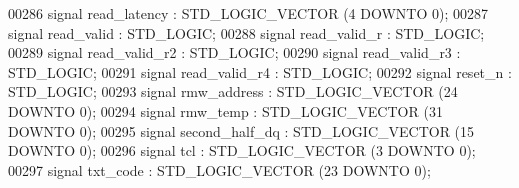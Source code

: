 \begin{DoxyCode}
00286                 \textcolor{keywordflow}{signal} \textcolor{vhdlchar}{read_latency} \textcolor{vhdlchar}{:}  \textcolor{comment}{STD\_LOGIC\_VECTOR} \textcolor{vhdlchar}{(}\textcolor{vhdllogic}{}\textcolor{vhdllogic}{4} \textcolor{keywordflow}{DOWNTO} \textcolor{vhdllogic}{}\textcolor{vhdllogic}{0}\textcolor{vhdlchar}{)};
00287                 \textcolor{keywordflow}{signal} \textcolor{vhdlchar}{read_valid} \textcolor{vhdlchar}{:}  \textcolor{comment}{STD\_LOGIC};
00288                 \textcolor{keywordflow}{signal} \textcolor{vhdlchar}{read_valid_r} \textcolor{vhdlchar}{:}  \textcolor{comment}{STD\_LOGIC};
00289                 \textcolor{keywordflow}{signal} \textcolor{vhdlchar}{read_valid_r2} \textcolor{vhdlchar}{:}  \textcolor{comment}{STD\_LOGIC};
00290                 \textcolor{keywordflow}{signal} \textcolor{vhdlchar}{read_valid_r3} \textcolor{vhdlchar}{:}  \textcolor{comment}{STD\_LOGIC};
00291                 \textcolor{keywordflow}{signal} \textcolor{vhdlchar}{read_valid_r4} \textcolor{vhdlchar}{:}  \textcolor{comment}{STD\_LOGIC};
00292                 \textcolor{keywordflow}{signal} \textcolor{vhdlchar}{reset_n} \textcolor{vhdlchar}{:}  \textcolor{comment}{STD\_LOGIC};
00293                 \textcolor{keywordflow}{signal} \textcolor{vhdlchar}{rmw_address} \textcolor{vhdlchar}{:}  \textcolor{comment}{STD\_LOGIC\_VECTOR} \textcolor{vhdlchar}{(}\textcolor{vhdllogic}{}\textcolor{vhdllogic}{24} \textcolor{keywordflow}{DOWNTO} \textcolor{vhdllogic}{}\textcolor{vhdllogic}{0}\textcolor{vhdlchar}{)};
00294                 \textcolor{keywordflow}{signal} \textcolor{vhdlchar}{rmw_temp} \textcolor{vhdlchar}{:}  \textcolor{comment}{STD\_LOGIC\_VECTOR} \textcolor{vhdlchar}{(}\textcolor{vhdllogic}{}\textcolor{vhdllogic}{31} \textcolor{keywordflow}{DOWNTO} \textcolor{vhdllogic}{}\textcolor{vhdllogic}{0}\textcolor{vhdlchar}{)};
00295                 \textcolor{keywordflow}{signal} \textcolor{vhdlchar}{second_half_dq} \textcolor{vhdlchar}{:}  \textcolor{comment}{STD\_LOGIC\_VECTOR} \textcolor{vhdlchar}{(}\textcolor{vhdllogic}{}\textcolor{vhdllogic}{15} \textcolor{keywordflow}{DOWNTO} \textcolor{vhdllogic}{}\textcolor{vhdllogic}{0}\textcolor{vhdlchar}{)};
00296                 \textcolor{keywordflow}{signal} \textcolor{vhdlchar}{tcl} \textcolor{vhdlchar}{:}  \textcolor{comment}{STD\_LOGIC\_VECTOR} \textcolor{vhdlchar}{(}\textcolor{vhdllogic}{}\textcolor{vhdllogic}{3} \textcolor{keywordflow}{DOWNTO} \textcolor{vhdllogic}{}\textcolor{vhdllogic}{0}\textcolor{vhdlchar}{)};
00297                 \textcolor{keywordflow}{signal} \textcolor{vhdlchar}{txt_code} \textcolor{vhdlchar}{:}  \textcolor{comment}{STD\_LOGIC\_VECTOR} \textcolor{vhdlchar}{(}\textcolor{vhdllogic}{}\textcolor{vhdllogic}{23} \textcolor{keywordflow}{DOWNTO} \textcolor{vhdllogic}{}\textcolor{vhdllogic}{0}\textcolor{vhdlchar}{)};

\end{DoxyCode}
